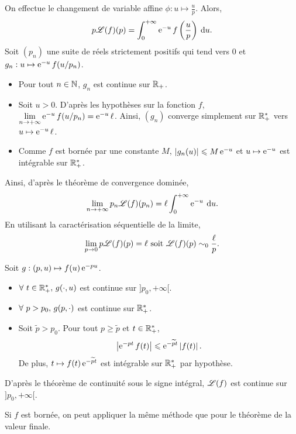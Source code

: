 \documentclass[oneside,11pt]{book}
\begin{document}
\begin{solution}
\smallskip


On effectue le changement de variable affine $\phi : u \mapsto \frac{u}{p}$. Alors,
\[
p \mathscr{L}(f)(p) = \displaystyle \int_0^{+\infty} \operatorname{e}^{-u} f\left(\frac{u}{p}\right) \:{\text d}u.
\]
Soit $(p_n)$ une suite de réels strictement positifs qui tend vers $0$ et $g_n : u \mapsto \operatorname{e}^{-u} f(u/p_n)$.
\begin{itemize}
\item Pour tout $n \in \mathbb{N}$, $g_n$ est continue sur $\mathbb{R}_+$.

\item Soit $u > 0$. D'après les hypothèses sur la fonction $f$, $\lim\limits_{n\to+\infty} \operatorname{e}^{-u} f(u/p_n) = \operatorname{e}^{-u} \ell$. Ainsi, $(g_n)$ converge simplement sur $\mathbb{R}_+^*$ vers $u \mapsto \operatorname{e}^{-u} \ell$.

\item Comme $f$ est bornée par une constante $M$, $\left\lvert g_n(u)\right\rvert \leqslant M \operatorname{e}^{-u}$ et $u \mapsto \operatorname{e}^{-u}$ est intégrable sur $\mathbb{R}_+^*$.
\end{itemize}
Ainsi, d'après le théorème de convergence dominée,
\[
\lim\limits_{n\to+\infty} p_n \mathscr{L}(f)(p_n) = \ell \displaystyle \int_0^{+\infty} \operatorname{e}^{-u} \:{\text d}u.
\]
En utilisant la caractérisation séquentielle de la limite,
\[
\lim\limits_{p\to 0} p \mathscr{L}(f)(p) = \ell \text{ soit } \mathscr{L}(f)(p) \sim_0 \frac{\ell}{p}.
\]

\qu Soit $g : (p, u) \mapsto f(u) \operatorname{e}^{-p u}$.
\begin{itemize}
\item $\forall~ t \in \mathbb{R}_+^*,\, g(\cdot, u)$ est continue sur $]p_0, +\infty[$.

\item $\forall~ p > p_0,\, g(p, \cdot)$ est continue sur $\mathbb{R}_+^*$.

\item Soit $\tilde{p} > p_0$. Pour tout $p \geq \tilde{p}$ et $t \in \mathbb{R}_+^*$,
\[
\left\lvert\operatorname{e}^{-p t} f(t)\right\rvert \leqslant \operatorname{e}^{- \widetilde{p} t} \left\lvert f(t)\right\rvert.
\]
De plus, $t \mapsto f(t) \operatorname{e}^{-\widetilde{p} t}$ est intégrable sur $\mathbb{R}_+^*$ par hypothèse.
\end{itemize}
D'après le théorème de continuité sous le signe intégral, $\mathscr{L}(f)$ est continue sur $]p_0, +\infty[$.

\qu Si $f$ est bornée, on peut appliquer la même méthode que pour le théorème de la valeur finale.

\smallskip


\end{solution}
\end{document}
